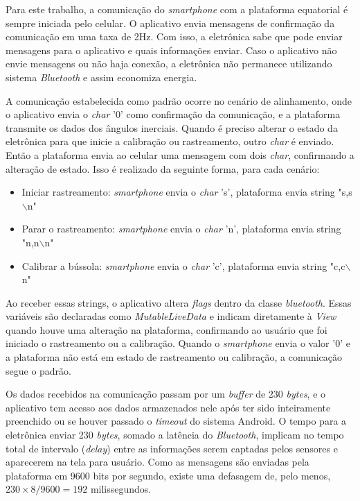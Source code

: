 Para este trabalho, a comunicação do \textit{smartphone} com a plataforma equatorial é sempre iniciada pelo celular. O aplicativo envia mensagens de confirmação da comunicação em uma taxa de 2Hz. Com isso, a eletrônica sabe que pode enviar mensagens para o aplicativo e quais informações enviar. Caso o aplicativo não envie mensagens ou não haja conexão, a eletrônica não permanece utilizando sistema \textit{Bluetooth} e assim economiza energia. 

A comunicação estabelecida como padrão ocorre no cenário de alinhamento, onde o aplicativo envia o \textit{char} '0' como confirmação da comunicação, e a plataforma transmite os dados dos ângulos inerciais. Quando é preciso alterar o estado da eletrônica para que inicie a calibração ou rastreamento, outro \textit{char} é enviado. Então a plataforma envia ao celular uma mensagem com dois \textit{char}, confirmando a alteração de estado. Isso é realizado da seguinte forma, para cada cenário:

\begin{itemize}
	\item Iniciar rastreamento: \textit{smartphone} envia o \textit{char} 's', plataforma envia string "s,s$ \backslash $n"
	\item Parar o rastreamento: \textit{smartphone} envia o \textit{char} 'n', plataforma envia string "n,n$ \backslash $n"
	\item Calibrar a bússola: \textit{smartphone} envia o \textit{char} 'c', plataforma envia string "c,c$ \backslash $n"
\end{itemize}

Ao receber essas strings, o aplicativo altera \textit{flags} dentro da classe \textit{bluetooth}. Essas variáveis são declaradas como \textit{MutableLiveData} e indicam diretamente à \textit{View} quando houve uma alteração na plataforma, confirmando ao usuário que foi iniciado o rastreamento ou a calibração. Quando o \textit{smartphone} envia o valor '0' e a plataforma não está em estado de rastreamento ou calibração, a comunicação segue o padrão. 

Os dados recebidos na comunicação passam por um \textit{buffer} de 230 \textit{bytes}, e o aplicativo tem acesso aos dados armazenados nele após ter sido inteiramente preenchido ou se houver passado o \textit{timeout} do sistema Android. O tempo para a eletrônica enviar 230 \textit{bytes}, somado a latência do \textit{Bluetooth}, implicam no tempo total de intervalo (\textit{delay}) entre as informações serem captadas pelos sensores e aparecerem na tela para usuário. Como as mensagens são enviadas pela plataforma em 9600 bits por segundo, existe uma defasagem de, pelo menos, $ 230\times8/9600 = 192 $ milissegundos.  


